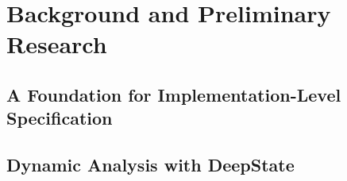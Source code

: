 \section{Background and Preliminary Research}

\subsection{A Foundation for Implementation-Level Specification}


\subsection{Dynamic Analysis with DeepState}


